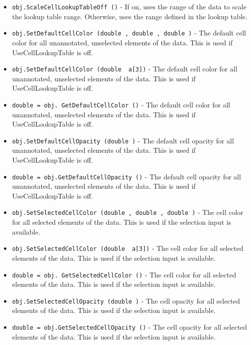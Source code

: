 \begin{itemize}
\item  \verb|obj.ScaleCellLookupTableOff ()| -  If on, uses the range of the data to scale the lookup table range.
 Otherwise, uses the range defined in the lookup table.

\item  \verb|obj.SetDefaultCellColor (double , double , double )| -  The default cell color for all unannotated, unselected elements
 of the data. This is used if UseCellLookupTable is off.

\item  \verb|obj.SetDefaultCellColor (double  a[3])| -  The default cell color for all unannotated, unselected elements
 of the data. This is used if UseCellLookupTable is off.

\item  \verb|double = obj. GetDefaultCellColor ()| -  The default cell color for all unannotated, unselected elements
 of the data. This is used if UseCellLookupTable is off.

\item  \verb|obj.SetDefaultCellOpacity (double )| -  The default cell opacity for all unannotated, unselected elements
 of the data. This is used if UseCellLookupTable is off.

\item  \verb|double = obj.GetDefaultCellOpacity ()| -  The default cell opacity for all unannotated, unselected elements
 of the data. This is used if UseCellLookupTable is off.

\item  \verb|obj.SetSelectedCellColor (double , double , double )| -  The cell color for all selected elements of the data.
 This is used if the selection input is available.

\item  \verb|obj.SetSelectedCellColor (double  a[3])| -  The cell color for all selected elements of the data.
 This is used if the selection input is available.

\item  \verb|double = obj. GetSelectedCellColor ()| -  The cell color for all selected elements of the data.
 This is used if the selection input is available.

\item  \verb|obj.SetSelectedCellOpacity (double )| -  The cell opacity for all selected elements of the data.
 This is used if the selection input is available.

\item  \verb|double = obj.GetSelectedCellOpacity ()| -  The cell opacity for all selected elements of the data.
 This is used if the selection input is available.


\end{itemize}
